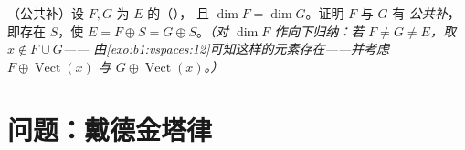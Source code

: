\begin{exercise}[$\star\star\star$]\label{exo:b1:findim:12}
（公共补）设 $F, G$ 为 $E$ 的（），
且 $\dim F = \dim G$。证明 $F$ 与 $G$ 有
\emph{公共补}，即存在 $S$，使 $E = F
\oplus S = G \oplus S$。\emph{（对 $\dim F$ 作向下归纳：若 $F
\neq G \neq E$，取 $x \notin F \cup G$——
由\cref{exo:b1:vspaces:12}可知这样的元素存在——并考虑 $F \oplus
\operatorname{Vect}(x)$ 与 $G \oplus \operatorname{Vect}(x)$。）}
\end{exercise}

\section{问题：戴德金塔律}

